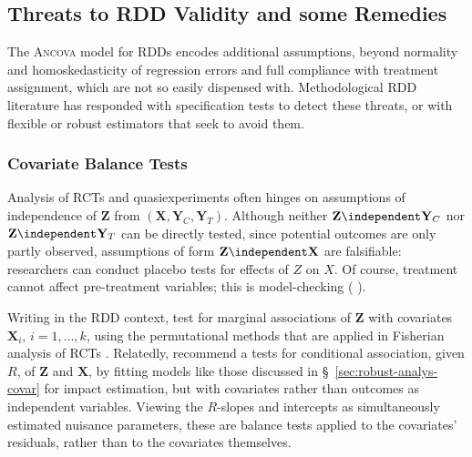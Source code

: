 \subsection{Threats to RDD Validity and some Remedies}\label{sec:specification}

The \textsc{Ancova} model for RDDs encodes additional assumptions,
beyond normality and homoskedasticity of regression errors and full
compliance with treatment assignment, which are not so easily
dispensed with.
Methodological RDD literature has responded with specification tests
to detect these threats, or with flexible or robust estimators that
seek to avoid them.

\subsubsection{Covariate Balance Tests}\label{sec:balanceTesting}
Analysis of RCTs and quasiexperiments often hinges on assumptions of
independence of
 $\mathbf{Z}$ from $(\mathbf{X}, \mathbf{Y}_{C}, \mathbf{Y}_{T})$.
 Although neither $\mathbf{Z} \independent \mathbf{Y}_{C}$ nor
 $\mathbf{Z} \independent \mathbf{Y}_{T}$ can be directly tested,
 since potential outcomes are only partly observed, assumptions of form
 $\mathbf{Z} \independent \mathbf{X}$ are falsifiable: researchers can
 conduct placebo tests for effects of $Z$ on $X$.
Of course, treatment cannot affect pre-treatment variables; this is
model-checking (%
\citealp[][\S~5.13]{cox2006pos}%
).  %

 Writing in the RDD context, \citet{cattaneo2014randomization} test
 for marginal associations of $\mathbf{Z}$ with covariates $\mathbf{X}_{i}$,
 $i=1, \ldots, k$, using the permutational methods that are applied
 in Fisherian analysis of RCTs \citep[also see][]{liMatteiMealli2015BayesianRD}.
Relatedly, \citet{lee2010regression} recommend a
 tests for conditional association, given $R$, of $\mathbf{Z}$ and
 $\mathbf{X}$, by fitting models like those discussed in
 \S~\ref{sec:robust-analys-covar} for impact estimation, but with
 covariates rather than outcomes as independent variables.
Viewing the $R$-slopes and intercepts as simultaneously estimated
 nuisance parameters, these are balance tests applied to
 the covariates' residuals, %
rather than to the covariates themselves.


